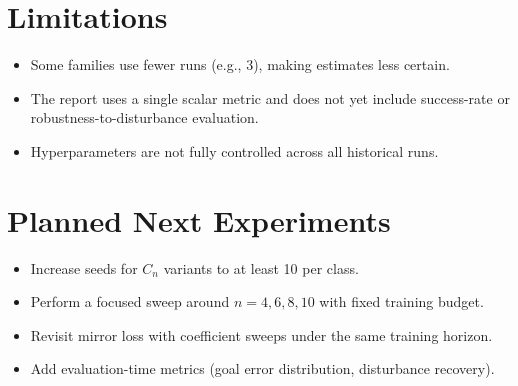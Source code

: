 \documentclass[11pt]{article}
\begin{document}
\section{Limitations}
\begin{itemize}
    \item Some families use fewer runs (e.g., 3), making estimates less certain.
    \item The report uses a single scalar metric and does not yet include success-rate or robustness-to-disturbance evaluation.
    \item Hyperparameters are not fully controlled across all historical runs.
\end{itemize}

\section{Planned Next Experiments}
\begin{itemize}
    \item Increase seeds for $C_n$ variants to at least 10 per class.
    \item Perform a focused sweep around $n=4,6,8,10$ with fixed training budget.
    \item Revisit mirror loss with coefficient sweeps under the same training horizon.
    \item Add evaluation-time metrics (goal error distribution, disturbance recovery).
\end{itemize}
\end{document}
